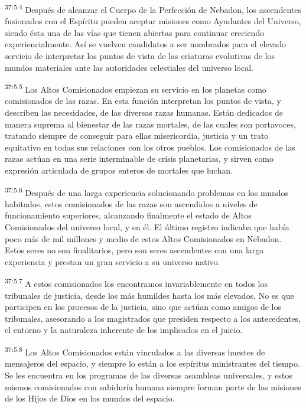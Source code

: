 \par
\textsuperscript{37:5.4} Después de alcanzar el Cuerpo de la Perfección de Nebadon, los ascendentes fusionados con el Espíritu pueden aceptar misiones como Ayudantes del Universo, siendo ésta una de las vías que tienen abiertas para continuar creciendo experiencialmente. Así se vuelven candidatos a ser nombrados para el elevado servicio de interpretar los puntos de vista de las criaturas evolutivas de los mundos materiales ante las autoridades celestiales del universo local.

\par
\textsuperscript{37:5.5} Los Altos Comisionados empiezan su servicio en los planetas como comisionados de las razas. En esta función interpretan los puntos de vista, y describen las necesidades, de las diversas razas humanas. Están dedicados de manera suprema al bienestar de las razas mortales, de las cuales son portavoces, tratando siempre de conseguir para ellas misericordia, justicia y un trato equitativo en todas sus relaciones con los otros pueblos. Los comisionados de las razas actúan en una serie interminable de crisis planetarias, y sirven como expresión articulada de grupos enteros de mortales que luchan.

\par
\textsuperscript{37:5.6} Después de una larga experiencia solucionando problemas en los mundos habitados, estos comisionados de las razas son ascendidos a niveles de funcionamiento superiores, alcanzando finalmente el estado de Altos Comisionados del universo local, y en él. El último registro indicaba que había poco más de mil millones y medio de estos Altos Comisionados en Nebadon. Estos seres no son finalitarios, pero son seres ascendentes con una larga experiencia y prestan un gran servicio a su universo nativo.

\par
\textsuperscript{37:5.7} A estos comisionados los encontramos invariablemente en todos los tribunales de justicia, desde los más humildes hasta los más elevados. No es que participen en los procesos de la justicia, sino que actúan como amigos de los tribunales, asesorando a los magistrados que presiden respecto a los antecedentes, el entorno y la naturaleza inherente de los implicados en el juicio.

\par
\textsuperscript{37:5.8} Los Altos Comisionados están vinculados a las diversas huestes de mensajeros del espacio, y siempre lo están a los espíritus ministrantes del tiempo. Se les encuentra en los programas de las diversas asambleas universales, y estos mismos comisionados con sabiduría humana siempre forman parte de las misiones de los Hijos de Dios en los mundos del espacio.

